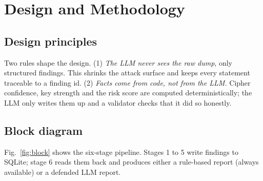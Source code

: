 \section{Design and Methodology}

\subsection{Design principles}
Two rules shape the design. (1) \emph{The LLM never sees the raw dump}, only structured findings. This
shrinks the attack surface and keeps every statement traceable to a finding id. (2) \emph{Facts come from
code, not from the LLM.} Cipher confidence, key strength and the risk score are computed
deterministically; the LLM only writes them up and a validator checks that it did so honestly.

\subsection{Block diagram}
Fig.~\ref{fig:block} shows the six-stage pipeline. Stages 1 to 5 write findings to SQLite; stage 6 reads
them back and produces either a rule-based report (always available) or a defended LLM report.

